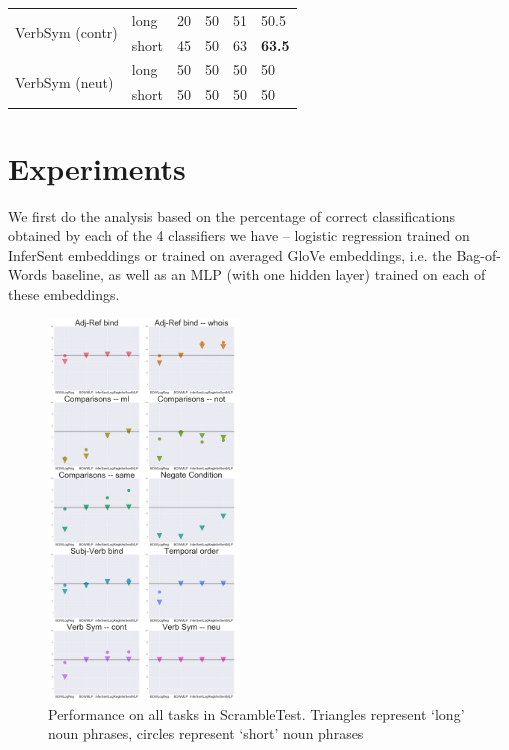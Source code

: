 \documentclass[10pt,letterpaper]{article}
\begin{document}
\begin{center}
\begin{table}[ht!]
\begin{tabular}{||l | l | l | l | l | l ||}
	\multirow{2}{*}{\parbox{1.3cm}{VerbSym (contr)}} &long&20&50&51&50.5 \\
    \cline{2-6}
     &short&45&50&63&\textbf{63.5}  \\
     \hline
    
    \multirow{2}{*}{\parbox{1.3cm}{VerbSym (neut)}} &long&50&50&50&50\\
    \cline{2-6}
     &short&50&50&50&50\\
     \hline
    
    
     \hline
  \end{tabular}
 
\end{table}
\end{center}



\section{Experiments}
We first do the analysis based on the percentage of correct classifications obtained by each of the 4 classifiers we have -- logistic regression trained on InferSent embeddings or trained on averaged GloVe embeddings, i.e. the Bag-of-Words baseline, as well as an MLP (with one hidden layer) trained on each of these embeddings.
\begin{figure}[t!]
\centering
\includegraphics[width=0.45\textwidth]{AllTasks.png}
\caption{Performance on all tasks in ScrambleTest. Triangles represent `long' noun phrases, circles represent `short' noun phrases}
\label{fig:AllTasks}
\end{figure}
\end{document}
